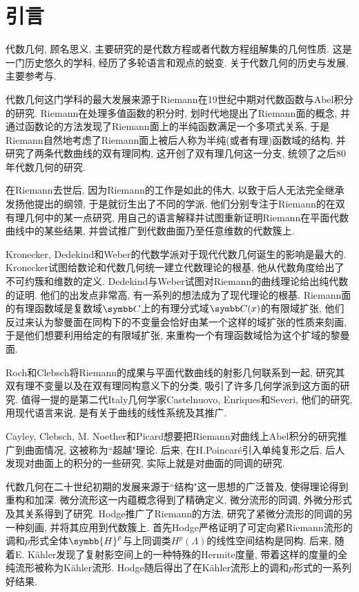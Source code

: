 
\section{引言}

代数几何, 顾名思义, 主要研究的是代数方程或者代数方程组解集的几何性质. 这是一门历史悠久的学科, 经历了多轮语言和观点的蜕变. 关于代数几何的历史与发展, 主要参考\parencite[18--113, V-VIII]{sally_history_1985}与\parencite[xiii, Introduction]{hartshorne_algebraic_1977}.

代数几何这门学科的最大发展来源于Riemann在19世纪中期对代数函数与Abel积分的研究. Riemann在处理多值函数的积分时, 划时代地提出了Riemann面的概念, 并通过函数论的方法发现了Riemann面上的半纯函数满足一个多项式关系, 于是Riemann自然地考虑了Riemann面上被后人称为半纯(或者有理)函数域的结构, 并研究了两条代数曲线的双有理同构, 这开创了双有理几何这一分支, 统领了之后80年代数几何的研究.

在Riemann去世后, 因为Riemann的工作是如此的伟大, 以致于后人无法完全继承发扬他提出的纲领, 于是就衍生出了不同的学派. 他们分别专注于Riemann的在双有理几何中的某一点研究, 用自己的语言解释并试图重新证明Riemann在平面代数曲线中的某些结果, 并尝试推广到代数曲面乃至任意维数的代数簇上.

Kronecker, Dedekind和Weber的代数学派对于现代代数几何诞生的影响是最大的. Kronecker试图给数论和代数几何统一建立代数理论的根基, 他从代数角度给出了不可约簇和维数的定义. Dedekind与Weber试图对Riemann的曲线理论给出纯代数的证明. 他们的出发点非常高, 有一系列的想法成为了现代理论的根基. Riemann面的有理函数域是复数域$\CC$上的有理分式域$\CC(x)$的有限域扩张, 他们反过来认为黎曼面在同构下的不变量会恰好由某一个这样的域扩张的性质来刻画, 于是他们想要利用给定的有限域扩张, 来重构一个有理函数域恰为这个扩域的黎曼面.

Roch和Clebsch将Riemann的成果与平面代数曲线的射影几何联系到一起, 研究其双有理不变量以及在双有理同构意义下的分类, 吸引了许多几何学派到这方面的研究. 值得一提的是第二代Italy几何学家Castelnuovo, Enriques和Severi, 他们的研究, 用现代语言来说, 是有关于曲线的线性系统及其推广.

Cayley, Clebsch, M. Noether和Picard想要把Riemann对曲线上Abel积分的研究推广到曲面情况, 这被称为``超越"理论. 后来, 在H.Poincar\'e引入单纯复形之后, 后人发现对曲面上的积分的一些研究, 实际上就是对曲面的同调的研究.

代数几何在二十世纪初期的发展来源于``结构"这一思想的广泛普及, 使得理论得到重构和加深. 微分流形这一内蕴概念得到了精确定义, 微分流形的同调, 外微分形式及其关系得到了研究. Hodge推广了Riemann的方法, 研究了紧微分流形的同调的另一种刻画, 并将其应用到代数簇上. 首先Hodge严格证明了可定向紧Riemann流形的调和$p$形式全体$\symbb{H}^p$与上同调类$H^p(\Lambda)$的线性空间结构是同构. 后来, 随着E. K\"ahler发现了复射影空间上的一种特殊的Hermite度量, 带着这样的度量的全纯流形被称为K\"ahler流形. Hodge随后得出了在K\"ahler流形上的调和$p$形式的一系列好结果.

